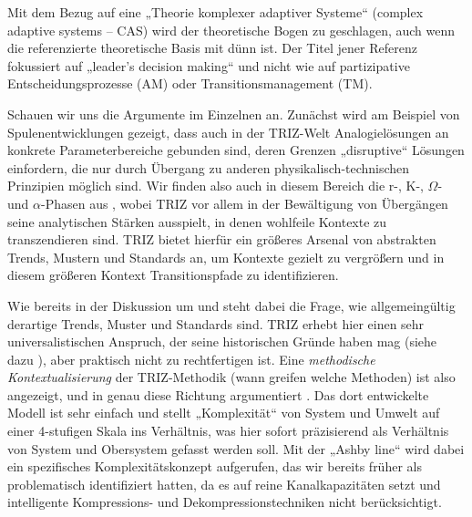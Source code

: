 \documentclass[11pt,a4paper]{article}
\begin{document}
Mit dem Bezug auf eine „Theorie komplexer adaptiver Systeme“ (complex adaptive
systems -- CAS) wird der theoretische Bogen zu \cite{Foxon2009} geschlagen,
auch wenn die referenzierte theoretische Basis mit \cite{Snowden2007} dünn
ist. Der Titel jener Referenz fokussiert auf „leader's decision making“ und
nicht wie \cite{Foxon2009} auf partizipative Entscheidungsprozesse (AM) oder
Transitionsmanagement (TM).

Schauen wir uns die Argumente im Einzelnen an. Zunächst wird am Beispiel von
Spulenentwicklungen gezeigt, dass auch in der TRIZ-Welt Analogielösungen an
konkrete Parameterbereiche gebunden sind, deren Grenzen „disruptive“ Lösungen
einfordern, die nur durch Übergang zu anderen physikalisch-technischen
Prinzipien möglich sind. Wir finden also auch in diesem Bereich die r-, K-,
$\Omega$- und $\alpha$-Phasen aus \cite{Holling2000}, wobei TRIZ vor allem in
der Bewältigung von Übergängen seine analytischen Stärken ausspielt, in denen
wohlfeile Kontexte zu trans\-zendieren sind. TRIZ bietet hierfür ein größeres
Arsenal von abstrakten Trends, Mustern und Standards an, um Kontexte gezielt
zu vergrößern und in diesem größeren Kontext Transitionspfade zu
identifizieren.

Wie bereits in der Diskussion um \cite{Geels2007} und \cite{Foxon2009} steht
dabei die Frage, wie allgemeingültig derartige Trends, Muster und Standards
sind. TRIZ erhebt hier einen sehr universalistischen Anspruch, der seine
historischen Gründe haben mag (siehe dazu \cite{Gerovich1996}), aber praktisch
nicht zu rechtfertigen ist. Eine \emph{methodische Kontextualisierung} der
TRIZ-Methodik (wann greifen welche Methoden) ist also angezeigt, und in genau
diese Richtung argumentiert \cite{Mann2019}.  Das dort entwickelte Modell ist
sehr einfach und stellt „Komplexität“ von System und Umwelt auf einer
4-stufigen Skala ins Verhältnis, was hier sofort präzisierend als Verhältnis
von System und Obersystem gefasst werden soll. Mit der „Ashby line“ wird dabei
ein spezifisches Komplexitätskonzept aufgerufen, das wir bereits früher als
problematisch identifiziert hatten, da es auf reine Kanalkapazitäten setzt und
intelligente Kompressions- und Dekompressionstechniken nicht berücksichtigt.
\end{document}
